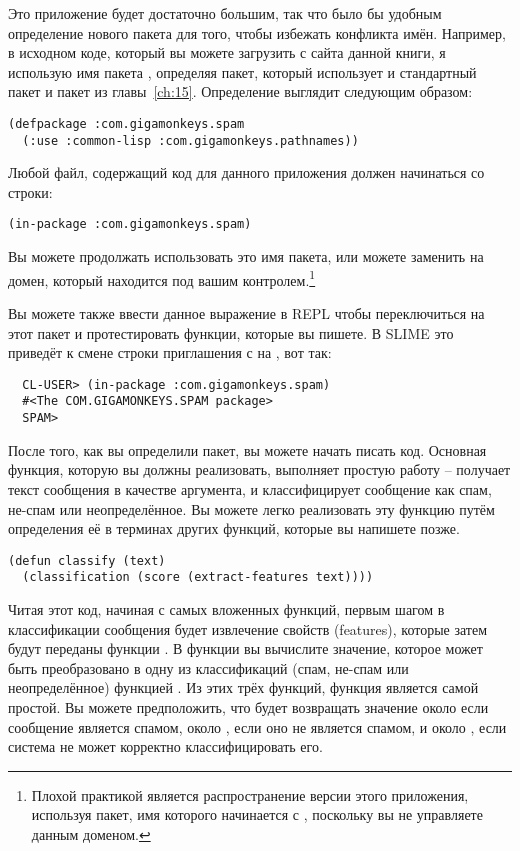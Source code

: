Это приложение будет достаточно большим, так что было бы удобным определение нового пакета
для того, чтобы избежать конфликта имён.  Например, в исходном коде, который вы можете
загрузить с сайта данной книги, я использую имя пакета ,
определяя пакет, который использует и стандартный пакет  и пакет
 из главы~\ref{ch:15}.  Определение выглядит следующим
образом:

\begin{lstlisting}
(defpackage :com.gigamonkeys.spam
  (:use :common-lisp :com.gigamonkeys.pathnames))
\end{lstlisting}

Любой файл, содержащий код для данного приложения должен начинаться со строки:

\begin{lstlisting}
(in-package :com.gigamonkeys.spam)
\end{lstlisting}

Вы можете продолжать использовать это имя пакета, или можете заменить
 на домен, который находится под вашим контролем.\footnote{Плохой
  практикой является распространение версии этого приложения, используя пакет, имя
  которого начинается с , поскольку вы не управляете данным
  доменом.}

Вы можете также ввести данное выражение в REPL чтобы переключиться на этот пакет и
протестировать функции, которые вы пишете.  В SLIME это приведёт к смене строки
приглашения с  на , вот так:

\begin{verbatim}
  CL-USER> (in-package :com.gigamonkeys.spam)
  #<The COM.GIGAMONKEYS.SPAM package>
  SPAM> 
\end{verbatim}

После того, как вы определили пакет, вы можете начать писать код.  Основная функция,
которую вы должны реализовать, выполняет простую работу -- получает текст сообщения в
качестве аргумента, и классифицирует сообщение как спам, не-спам или неопределённое.  Вы
можете легко реализовать эту функцию путём определения её в терминах других функций,
которые вы напишете позже.

\begin{lstlisting}
(defun classify (text)
  (classification (score (extract-features text))))
\end{lstlisting}

Читая этот код, начиная с самых вложенных функций, первым шагом в классификации сообщения
будет извлечение свойств (features), которые затем будут переданы функции .  В
функции  вы вычислите значение, которое может быть преобразовано в одну из
классификаций (спам, не-спам или неопределённое) функцией .  Из этих
трёх функций, функция  является самой простой. Вы можете
предположить, что  будет возвращать значение около  если сообщение
является спамом, около , если оно не является спамом, и около , если
система не может корректно классифицировать его.

